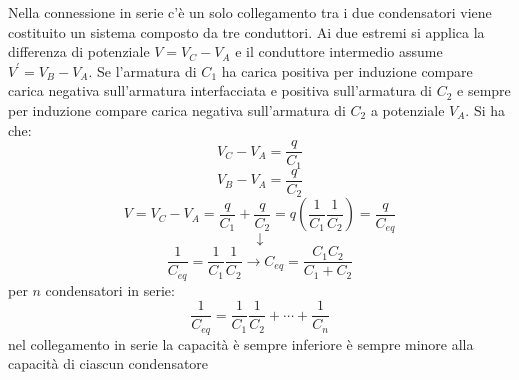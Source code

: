 \documentclass[a4paper,12pt, oneside]{book}
\begin{document}
\begin{itemize}
\begin{center}
	      \end{center}
	      Nella connessione in serie c'è un solo collegamento tra i due condensatori  viene costituito un sistema composto da tre conduttori. Ai due estremi si applica la differenza di potenziale $V=V_C-V_A$ e il conduttore intermedio assume $V^{'}=V_B-V_A$. Se l'armatura di $C_1$ ha carica positiva per induzione compare carica negativa sull'armatura interfacciata e positiva sull'armatura di $C_2$ e sempre per induzione compare carica negativa sull'armatura di $C_2$ a potenziale $V_A$. Si ha che:
	      $$V_C-V_A=\frac{q}{C_1}$$
	      $$V_B-V_A=\frac{q}{C_2}$$
	      $$V=V_C-V_A=\frac{q}{C_1}+\frac{q}{C_2}=q\left(\frac{1}{C_1}\frac{1}{C_2}\right)=\frac{q}{C_{eq}}$$
	      $$\downarrow$$
	      $$\frac{1}{C_{eq}}=\frac{1}{C_1}\frac{1}{C_2}\longrightarrow C_{eq}=\frac{C_1C_2}{C_1+C_2}$$
	      per $n$ condensatori in serie:
	      $$\frac{1}{C_{eq}}=\frac{1}{C_1}\frac{1}{C_2}+\cdots+\frac{1}{C_n}$$
	      nel collegamento in serie la capacità è sempre inferiore è sempre minore alla capacità di ciascun condensatore
\end{itemize}
\end{document}
